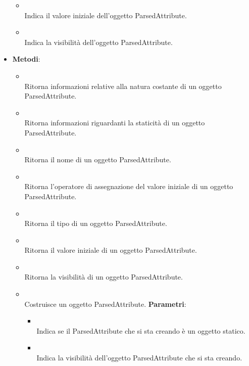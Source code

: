 \begin{itemize}
\begin{itemize}
\item {}
\\ Indica il valore iniziale dell'oggetto ParsedAttribute.
\item {}
\\ Indica la visibilità dell'oggetto ParsedAttribute.
\end{itemize}
\item \textbf{Metodi}:
\begin{itemize}
\item {}
\\ Ritorna informazioni relative alla natura costante di un oggetto ParsedAttribute.
\item {}
\\ Ritorna informazioni riguardanti la staticità di un oggetto ParsedAttribute.
\item {}
\\ Ritorna il nome di un oggetto ParsedAttribute.
\item {}
\\ Ritorna l'operatore di assegnazione del valore iniziale di un oggetto ParsedAttribute.
\item {}
\\ Ritorna il tipo di un oggetto ParsedAttribute.
\item {}
\\ Ritorna il valore iniziale di un oggetto ParsedAttribute.
\item {}
\\ Ritorna la visibilità di un oggetto ParsedAttribute.
\item {}
\\ Costruisce un oggetto ParsedAttribute.
\textbf{Parametri}:
\begin{itemize}
\item {}
\\ Indica se il ParsedAttribute che si sta creando è un oggetto statico.
\item {}
\\ Indica la visibilità dell'oggetto ParsedAttribute che si sta creando.

\end{itemize}
\end{itemize}
\end{itemize}
